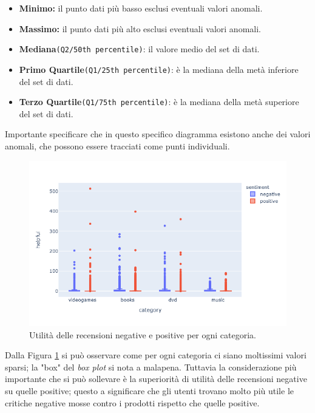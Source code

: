 			\begin{itemize}
				\item \textbf{Minimo:} il punto dati più basso esclusi eventuali valori anomali.
				\item \textbf{Massimo:} il punto dati più alto esclusi eventuali valori anomali.
				\item \textbf{Mediana}\verb|(Q2/50th percentile)|: il valore medio del set di dati.
				\item \textbf{Primo Quartile}\verb|(Q1/25th percentile)|: è la mediana della metà inferiore del set di dati.
				\item \textbf{Terzo Quartile}\verb|(Q1/75th percentile)|: è la mediana della metà superiore del set di dati.
			\end{itemize} 
		
			Importante specificare che in questo specifico diagramma esistono anche dei valori anomali, che possono essere tracciati come punti individuali. \\
				
			\begin{figure}
				\includegraphics[width=\textwidth]{Figure/boxplot-ratingVShelpful}	
				\caption{Utilità delle recensioni negative e positive per ogni categoria.}
				\label{fig:boxplot-ratingVShelpful}
			\end{figure}
			
			Dalla Figura \ref{fig:boxplot-ratingVShelpful} si può osservare come per ogni categoria ci siano moltissimi valori sparsi; la "box" del \textit{box plot} si nota a malapena. Tuttavia la considerazione più importante che si può sollevare è la superiorità di utilità delle recensioni negative su quelle positive; questo a significare che gli utenti trovano molto più utile le critiche negative mosse contro i prodotti rispetto che quelle positive.
			

				
		
		